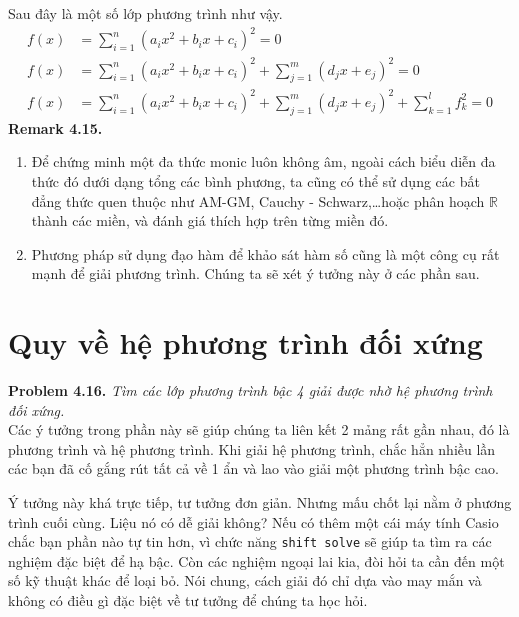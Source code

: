 \documentclass[a4paper,oneside]{book}
\numberwithin{equation}{chapter}
\begin{document}
Sau đây là một số lớp phương trình như vậy.
\begin{align}
f\left( x \right) &= \sum\limits_{i = 1}^n {{{\left( {{a_i}{x^2} + {b_i}x + {c_i}} \right)}^2} = 0} \\
f\left( x \right) &= \sum\limits_{i = 1}^n {{{\left( {{a_i}{x^2} + {b_i}x + {c_i}} \right)}^2} + \sum\limits_{j = 1}^m {{{\left( {{d_j}x + {e_j}} \right)}^2}}  = 0} \\
f\left( x \right) &= \sum\limits_{i = 1}^n {{{\left( {{a_i}{x^2} + {b_i}x + {c_i}} \right)}^2} + \sum\limits_{j = 1}^m {{{\left( {{d_j}x + {e_j}} \right)}^2}}  + \sum\limits_{k = 1}^l {f_k^2}  = 0} 
\end{align}
\textbf{Remark 4.15.} 
\begin{enumerate}
\item Để chứng minh một đa thức monic luôn không âm, ngoài cách biểu diễn đa thức đó dưới dạng tổng các bình phương, ta cũng có thể sử dụng các bất đẳng thức quen thuộc như AM-GM, Cauchy - Schwarz,\ldots hoặc phân hoạch $\mathbb{R}$ thành các miền, và đánh giá thích hợp trên từng miền đó.
\item Phương pháp sử dụng đạo hàm để khảo sát hàm số cũng là một công cụ rất mạnh để giải phương trình. Chúng ta sẽ xét ý tưởng này ở các phần sau.
\end{enumerate}
\section{Quy về hệ phương trình đối xứng}
\textbf{Problem 4.16.} \textit{Tìm các lớp phương trình bậc 4 giải được nhờ hệ phương trình đối xứng.}\\

Các ý tưởng trong phần này sẽ giúp chúng ta liên kết 2 mảng rất gần nhau, đó là phương trình và hệ phương trình. Khi giải hệ phương trình, chắc hẳn nhiều lần các bạn đã cố gắng rút tất cả về 1 ẩn và lao vào giải một phương trình bậc cao. 

Ý tưởng này khá trực tiếp, tư tưởng đơn giản. Nhưng mấu chốt lại nằm ở phương trình cuối cùng. Liệu nó có dễ giải không? Nếu có thêm một cái máy tính Casio chắc bạn phần nào tự tin hơn, vì chức năng \texttt{shift solve} sẽ giúp ta tìm ra các nghiệm đặc biệt để hạ bậc. Còn các nghiệm ngoại lai kia, đòi hỏi ta cần đến một số kỹ thuật khác để loại bỏ. Nói chung, cách giải đó chỉ dựa vào may mắn và không có điều gì đặc biệt về tư tưởng để chúng ta học hỏi.
\end{document}
